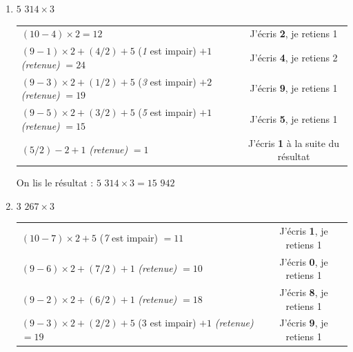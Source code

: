 \documentclass[a4paper]{article}
\begin{document}
\begin{small}
\begin{enumerate}

	\item $5$ $314 \times 3$

	\begin{tabular}{l|c}

		$(10 - 4) \times 2 = 12$ & J'écris \textbf{2}, je retiens 1
		
		\tabularnewline
		
		$(9 - 1) \times 2 + (4 / 2) + 5$ (\textit{1} est impair) $ + 1 $ \textit{(retenue)} $ = 24$ & J'écris \textbf{4}, je retiens 2

		\tabularnewline

		$(9 - 3) \times 2 + (1 / 2) + 5$ (\textit{3} est impair) $+ 2$ \textit{(retenue)} $= 19$ & J'écris \textbf{9}, je retiens 1
		
		\tabularnewline
		
		$(9 - 5) \times 2 + (3 / 2) + 5$ (\textit{5} est impair) $+ 1$ \textit{(retenue)} $= 15$ & J'écris \textbf{5}, je retiens 1
		
		\tabularnewline
		
		$(5 / 2) - 2 + 1$ \textit{(retenue)} $= 1$ & J'écris \textbf{1} à la suite du résultat	

	\end{tabular}

	On lis le résultat : {\boldmath $5$ $314 \times 3 = 15$ $942$}\\


	\item $3$ $267 \times 3$

	\begin{tabular}{l|c}

		$(10 - 7) \times 2 + 5$ (\textit{7} est impair) $= 11$ & J'écris \textbf{1}, je retiens 1
		
		\tabularnewline
		
		$(9 - 6) \times 2 + (7 / 2) + 1$ \textit{(retenue)} $= 10$ & J'écris \textbf{0}, je retiens 1
		
		\tabularnewline
		
		$(9 - 2) \times 2 + (6 / 2) + 1$ \textit{(retenue)} $= 18$ & J'écris \textbf{8}, je retiens 1
		
		\tabularnewline
		
		$(9 - 3) \times 2 + (2 / 2) + 5$ (3 est impair) $+ 1$ \textit{(retenue)} $= 19$ & J'écris \textbf{9}, je retiens 1
		

\end{tabular}
\end{enumerate}
\end{small}
\end{document}
